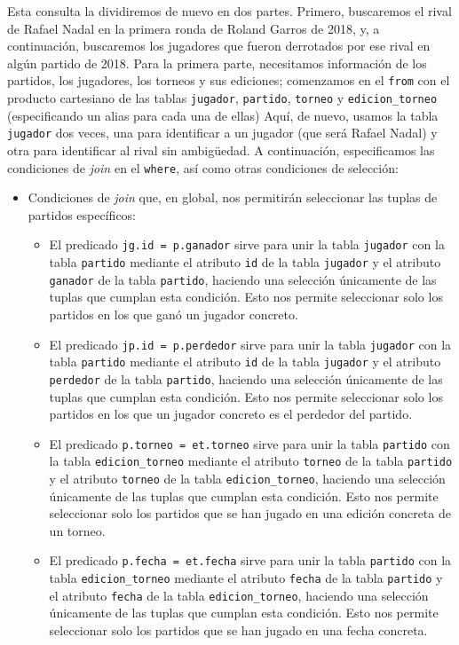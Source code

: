 Esta consulta la dividiremos de nuevo en dos partes. Primero, buscaremos el rival de Rafael Nadal en la primera ronda de Roland Garros de 2018, y, a continuación, buscaremos los jugadores que fueron derrotados por ese rival en algún partido de 2018. Para la primera parte, necesitamos información de los partidos, los jugadores, los torneos y sus ediciones; comenzamos en el \texttt{from} con el producto cartesiano de las tablas \texttt{jugador}, \texttt{partido}, \texttt{torneo} y \texttt{edicion\_torneo} (especificando un alias para cada una de ellas) Aquí, de nuevo, usamos la tabla \texttt{jugador} dos veces, una para identificar a un jugador (que será Rafael Nadal) y otra para identificar al rival sin ambigüedad. A continuación, especificamos las condiciones de \textit{join} en el \texttt{where}, así como otras condiciones de selección:
\begin{itemize}
\item Condiciones de \textit{join} que, en global, nos permitirán seleccionar las tuplas de partidos específicos:
\begin{itemize}
\item El predicado \texttt{jg.id = p.ganador} sirve para unir la tabla \texttt{jugador} con la tabla \texttt{partido} mediante el atributo \texttt{id} de la tabla \texttt{jugador} y el atributo \texttt{ganador} de la tabla \texttt{partido}, haciendo una selección únicamente de las tuplas que cumplan esta condición. Esto nos permite seleccionar solo los partidos en los que ganó un jugador concreto.
\item El predicado \texttt{jp.id = p.perdedor} sirve para unir la tabla \texttt{jugador} con la tabla \texttt{partido} mediante el atributo \texttt{id} de la tabla \texttt{jugador} y el atributo \texttt{perdedor} de la tabla \texttt{partido}, haciendo una selección únicamente de las tuplas que cumplan esta condición. Esto nos permite seleccionar solo los partidos en los que un jugador concreto es el perdedor del partido.
\item El predicado \texttt{p.torneo = et.torneo} sirve para unir la tabla \texttt{partido} con la tabla \texttt{edicion\_torneo} mediante el atributo \texttt{torneo} de la tabla \texttt{partido} y el atributo \texttt{torneo} de la tabla \texttt{edicion\_torneo}, haciendo una selección únicamente de las tuplas que cumplan esta condición. Esto nos permite seleccionar solo los partidos que se han jugado en una edición concreta de un torneo.
\item El predicado \texttt{p.fecha = et.fecha} sirve para unir la tabla \texttt{partido} con la tabla \texttt{edicion\_torneo} mediante el atributo \texttt{fecha} de la tabla \texttt{partido} y el atributo \texttt{fecha} de la tabla \texttt{edicion\_torneo}, haciendo una selección únicamente de las tuplas que cumplan esta condición. Esto nos permite seleccionar solo los partidos que se han jugado en una fecha concreta.

\end{itemize}
\end{itemize}
